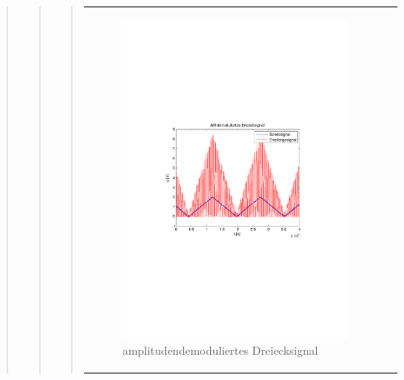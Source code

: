 \begin{quote}
\begin{quote}
\begin{quote}
\begin{center}
\begin{tabular}{ll}
\begin{minipage}{0.6\textwidth}
                    \end{minipage}
                    \begin{minipage}{0.6\textwidth}
    
                         \begin{figure}[H]
                            \label{fig:}
                            \includegraphics[scale=0.5, trim = 4cm 9.5cm 3.5cm
                        9.5cm, clip]{./Bilder/snychDemod_dreieck.pdf} %
                            \caption{amplitudendemoduliertes Dreiecksignal}
                        \end{figure}
                   \vspace{-1.5em}
    
                    \end{minipage}
    

\end{tabular}
\end{center}
\end{quote}
\end{quote}
\end{quote}
